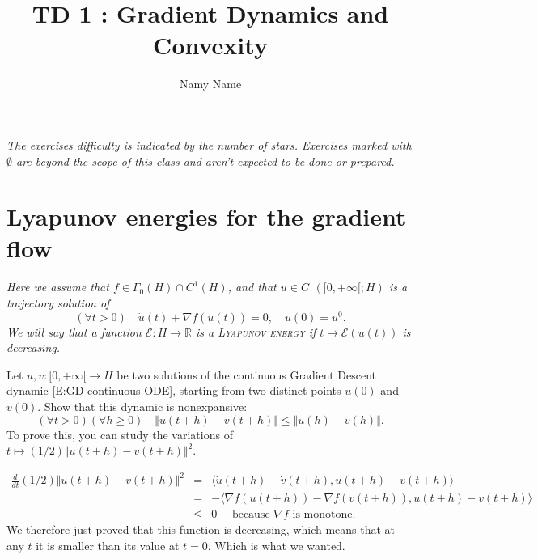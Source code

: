 \documentclass[a4paper,reqno,11pt]{amsart}
\title{TD 1 : Gradient Dynamics and Convexity}
\author{Namy Name}
\begin{document}
\maketitle

\textit{The exercises difficulty is indicated by the number of stars. Exercises marked with $\emptyset$ are beyond the scope of this class and aren't expected to be done or prepared.}


\section*{Lyapunov energies for the gradient flow}

\emph{Here we assume that $f \in \Gamma_0(H) \cap C^1(H)$, and that $u \in C^1([0,+\infty[;H)$ is a trajectory solution of 
\begin{equation}\label{E:GD continuous ODE}
(\forall t>0) \quad \dot u(t) + \nabla f(u(t)) = 0, \quad u(0) = u^0.
\end{equation}
We will say that a function $\mathcal{E} : H \rightarrow \mathbb{R}$ is a \textsc{Lyapunov energy} if $t \mapsto \mathcal{E}(u(t))$ is decreasing. }

\begin{exercise}
\notebf{*}
Let $u, v : [0,+\infty[ \rightarrow H$ be two solutions of the continuous Gradient Descent dynamic \eqref{E:GD continuous ODE}, starting from two distinct points $u(0)$ and $v(0)$.
Show that this dynamic is nonexpansive:
\begin{equation*}
(\forall t>0)(\forall h \geq 0) \quad \Vert u(t+h) - v(t+h) \Vert \leq \Vert u(h) - v(h) \Vert.
\end{equation*}
To prove this, you can study the variations of $t \mapsto (1/2) \Vert u(t+h) - v(t+h) \Vert^2$.
\end{exercise}

\begin{correction}
\begin{eqnarray*}
\frac{d}{dt} (1/2) \Vert u(t+h) - v(t+h) \Vert^2 
& = &
\langle \dot u(t+h) - \dot v(t+h) , u(t+h) - v(t+h) \rangle \\
& = &
- \langle \nabla f(u(t+h)) - \nabla f( v(t+h)), u(t+h) - v(t+h) \rangle \\
& \leq &
0 \quad \text{ because $\nabla f$ is monotone.}
\end{eqnarray*}
We therefore just proved that this function is decreasing, which means that at any $t$ it is smaller than its value at $t=0$. Which is what we wanted.
\end{correction}
\end{document}
